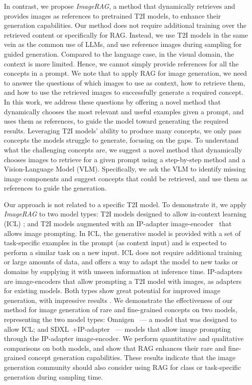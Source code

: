 In contrast, we propose \emph{ImageRAG}, a method that dynamically retrieves and provides images as references to pretrained T2I models, to enhance their generation capabilities.
Our method does not require additional training over the retrieved content or specifically for RAG. Instead, we use T2I models in the same vein as the common use of LLMs, and use reference images during sampling for guided generation.
Compared to the language case, in the visual domain, the context is more limited. Hence, we cannot simply provide references for all the concepts in a prompt. 
We note that to apply RAG for image generation, we need to answer the questions of which images to use as context, how to retrieve them, and how to use the retrieved images to successfully generate a required concept.
In this work, we address these questions by offering a novel method that dynamically chooses the most relevant and useful examples given a prompt, and uses them as references, to guide the model toward generating the required results.
Leveraging T2I models' ability to produce many concepts, we only pass concepts the models struggle to generate, focusing on the gaps.
To understand what the challenging concepts are,
we suggest a novel method that dynamically chooses images to retrieve for a given prompt using a step-by-step method and a Vision-Language Model (VLM).
Specifically, we ask the VLM to identify missing image components and suggest concepts that could be retrieved, and use them as references to guide the generation.

Our approach is not related to a specific T2I model.
To demonstrate it, we apply \emph{ImageRAG} to two model types: T2I models designed to allow in-context learning (ICL) \cite{brown2020language}; and T2I models augmented with an IP-adapter image-encoder~\cite{ye2023ip} that allows image prompting.
In ICL, the generative model is provided with a set of task-specific examples in the prompt (as context input) and is expected to perform a similar task on a new input.
ICL does not require additional training or large amounts of data, and offers a way to adapt the model to new tasks or domains by supplying it with unseen information at inference time.
IP-adapters are image-encoders that allow prompting a T2I model with images, as adapters for existing models. 
Both types show great potential for improved image generation, with impressive results \cite{ye2023ip, xiao2024omnigen, gu2024analogist, wang2023context, najdenkoska2024context, sun2024generative}.  
We demonstrate the effectiveness of our method for image generation of rare and fine-grained concepts on two models, representing the two model types: 
Omnigen~\cite{xiao2024omnigen} --- a model that was designed to allow ICL; 
and SDXL~\cite{podellsdxl}+IP-adapter~\cite{ye2023ip} --- models that 
allow image prompting through the IP-adapter image-encoder.
We perform quantitative and qualitative comparisons on both models, and show that RAG enhances their rare and fine-grained concept generation capabilities. These results indicate that the image generation community should also consider using RAG for class or task-specific generation during sampling time.